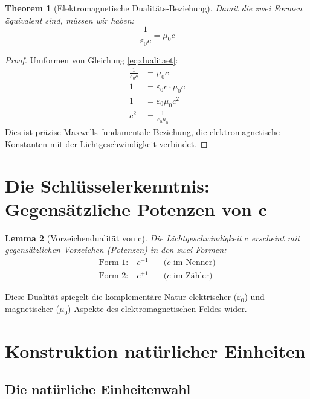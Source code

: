 \documentclass[12pt,a4paper]{article}
\newtheorem{theorem}{Theorem}[section]
\newtheorem{lemma}[theorem]{Lemma}
\begin{document}
	\begin{theorem}[Elektromagnetische Dualitäts-Beziehung]
		Damit die zwei Formen äquivalent sind, müssen wir haben:
		\begin{equation}
			\frac{1}{\varepsilon_0 c} = \mu_0 c \label{eq:dualitaet}
		\end{equation}
	\end{theorem}
	
	\begin{proof}
		Umformen von Gleichung \eqref{eq:dualitaet}:
		\begin{align}
			\frac{1}{\varepsilon_0 c} &= \mu_0 c\\
			1 &= \varepsilon_0 c \cdot \mu_0 c\\
			1 &= \varepsilon_0 \mu_0 c^2\\
			c^2 &= \frac{1}{\varepsilon_0 \mu_0}
		\end{align}
		Dies ist präzise Maxwells fundamentale Beziehung, die elektromagnetische Konstanten mit der Lichtgeschwindigkeit verbindet.
	\end{proof}
	
	\section{Die Schlüsselerkenntnis: Gegensätzliche Potenzen von c}
	
	\begin{lemma}[Vorzeichendualität von c]
		Die Lichtgeschwindigkeit $c$ erscheint mit gegensätzlichen \textit{Vorzeichen} (Potenzen) in den zwei Formen:
		\begin{align}
			\text{Form 1:} \quad c^{-1} \quad &\text{($c$ im Nenner)}\\
			\text{Form 2:} \quad c^{+1} \quad &\text{($c$ im Zähler)}
		\end{align}
	\end{lemma}
	
	Diese Dualität spiegelt die komplementäre Natur elektrischer ($\varepsilon_0$) und magnetischer ($\mu_0$) Aspekte des elektromagnetischen Feldes wider.
	
	\section{Konstruktion natürlicher Einheiten}
	
	\subsection{Die natürliche Einheitenwahl}
	
\end{document}
